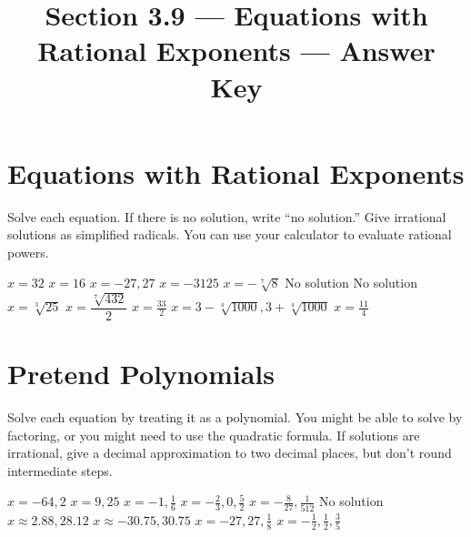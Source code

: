 

\title{Section 3.9 --- Equations with Rational Exponents --- Answer Key}


\maketitle

\section*{Equations with Rational Exponents}
Solve each equation. If there is no solution, write ``no solution.'' Give irrational solutions as simplified radicals. You can use your calculator to evaluate rational powers.
\begin{smenum}
\mitemxxx
{$x=32$}
{$x=16$}
{$x=-27,27$}
\mitemxxx
{$x=-3125$}
{$x=-\sqrt[7]{8}$}
{No solution}
\mitemxxx
{No solution}
{$x=\sqrt[3]{25}$}
{$x=\dfrac{\sqrt[7]{432}}{2}$}
\mitemxxx
{$x=\frac{33}{2}$}
{$x=3-\sqrt[4]{1000},3+\sqrt[4]{1000}$}
{$x=\frac{11}{4}$}
\end{smenum}

\section*{Pretend Polynomials}
Solve each equation by treating it as a polynomial. You might be able to solve by factoring, or you might need to use the quadratic formula. If solutions are irrational, give a decimal approximation to two decimal places, but don't round intermediate steps.
\begin{smenum}
\mitemxx
{$x=-64,2$}
{$x=9,25$}
\mitemxx
{$x=-1,\frac{1}{6}$}
{$x=-\frac{2}{3},0,\frac{5}{2}$}
\mitemxx
{$x=-\frac{8}{27},\frac{1}{512}$}
{No solution}
\mitemxx
{$x\approx 2.88,28.12$}
{$x\approx -30.75,30.75$}
\mitemxx
{$x=-27,27,\frac{1}{8}$}
{$x=-\frac{1}{2},\frac{1}{2},\frac{3}{5}$}
\end{smenum}



